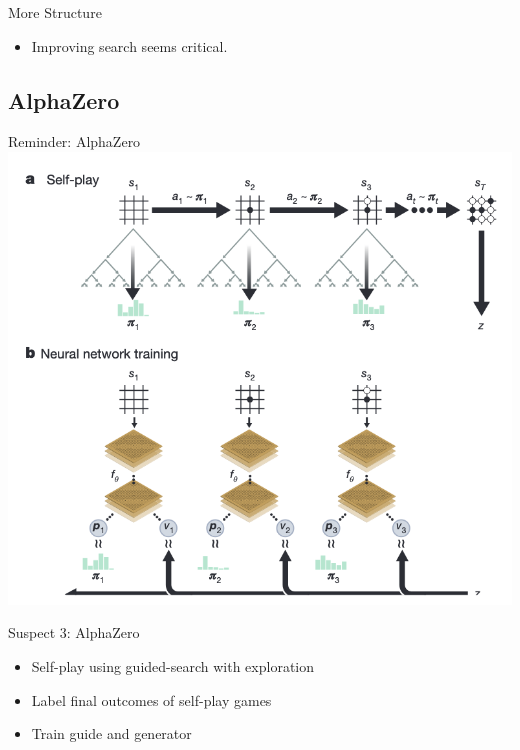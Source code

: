 \documentclass[14pt,aspectratio=169]{beamer}
\begin{document}
\begin{frame}{More Structure}
	\begin{itemize}
		\item Improving search seems critical.
	\end{itemize}
\end{frame}

\subsection{AlphaZero}

\begin{frame}{Reminder: AlphaZero}
	\centering
	\includegraphics[height=0.8\textheight]{images/alphazero_figure_one.png}
\end{frame}

\begin{frame}{Suspect 3: AlphaZero}
	\begin{itemize}
		\item Self-play using guided-search with exploration
		\item Label final outcomes of self-play games
		\item Train guide and generator
	\end{itemize}
\end{frame}
\end{document}
